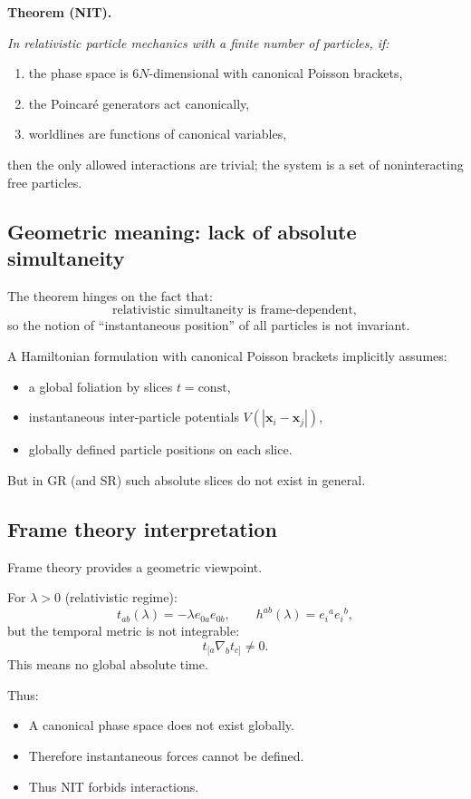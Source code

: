 \documentclass[12pt]{article}
\begin{document}
\medskip
\noindent
{\bf Theorem (NIT).}
{\it 
In relativistic particle mechanics with a finite number of particles,
if:
\begin{enumerate}
\item the phase space is $6N$-dimensional with canonical Poisson brackets,
\item the Poincaré generators act canonically,
\item worldlines are functions of canonical variables,
\end{enumerate}
then the only allowed interactions are trivial; 
the system is a set of noninteracting free particles.
}

\subsection{Geometric meaning: lack of absolute simultaneity}

The theorem hinges on the fact that:
\[
\text{relativistic simultaneity is frame-dependent},
\]
so the notion of ``instantaneous position'' of all particles is not invariant.

A Hamiltonian formulation with canonical Poisson brackets implicitly assumes:
\begin{itemize}
\item a global foliation by slices $t=\mathrm{const}$,
\item instantaneous inter-particle potentials $V(|\mathbf{x}_i-\mathbf{x}_j|)$,
\item globally defined particle positions on each slice.
\end{itemize}
But in GR (and SR) such absolute slices do not exist in general.

\subsection{Frame theory interpretation}

Frame theory provides a geometric viewpoint.

For $\lambda>0$ (relativistic regime):
\[
t_{ab}(\lambda) = -\lambda e_{0a}e_{0b}, 
\qquad 
h^{ab}(\lambda)=e_i{}^ae_i{}^b,
\]
but the temporal metric is not integrable:
\[
t_{[a}\nabla_b t_{c]} \neq 0.
\]
This means no global absolute time.

Thus:
\begin{itemize}
\item A canonical phase space does not exist globally.
\item Therefore instantaneous forces cannot be defined.
\item Thus NIT forbids interactions.
\end{itemize}
\end{document}
